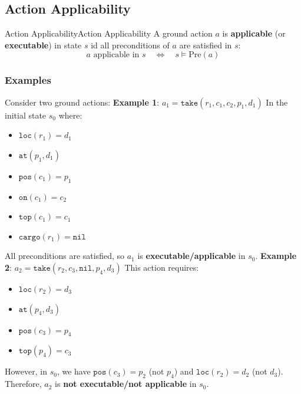\documentclass[a4paper]{article}
\theoremstyle{definition}
\begin{document}
\subsection{Action Applicability}
\begin{definition}{Action Applicability}{Action Applicability}
A ground action \( a \) is \textbf{applicable} (or \textbf{executable}) in state \( s \) id all preconditions of \( a \) are 
satisfied in \( s \):
\[
  a \text{ applicable in } s \quad \Leftrightarrow \quad s \models \mathrm{Pre}(a)
\]
\end{definition}
\subsubsection{Examples}
Consider two ground actions:
\vspace{1em}
\noindent
\newline
\textbf{Example 1}: \( a_1 = \texttt{take}(r_1,c_1,c_2,p_1,d_1) \)  
\vspace{1em}
\noindent
\newline
In the initial state \( s_0 \) where:
\begin{itemize}
    \item $\texttt{loc}(r_1) = d_1$
    \item $\texttt{at}(p_1,d_1)$
    \item $\texttt{pos}(c_1) = p_1$
    \item $\texttt{on}(c_1) = c_2$
    \item $\texttt{top}(c_1) = c_1$
    \item $\texttt{cargo}(r_1) = \texttt{nil}$
\end{itemize}
All preconditions are satisfied, so \( a_1 \) is \textbf{executable/applicable} in \( s_0 \).
\vspace{1em}
\noindent
\newline
\textbf{Example 2}: \( a_2 = \texttt{take}(r_2,c_3,\texttt{nil},p_4,d_3) \)    
\vspace{1em}
\noindent
\newline
This action requires:
\begin{itemize}
    \item $\texttt{loc}(r_2) = d_3$
    \item $\texttt{at}(p_4,d_3)$
    \item $\texttt{pos}(c_3) = p_4$
    \item $\texttt{top}(p_4) = c_3$
\end{itemize}
However, in \( s_0 \), we have \( \texttt{pos}(c_3) = p_2 \) (not $p_4$) and $\texttt{loc}(r_2) = d_2$ (not $d_3$). Therefore, 
$a_2$ is \textbf{not executable/not applicable} in $s_0$.
\end{document}
